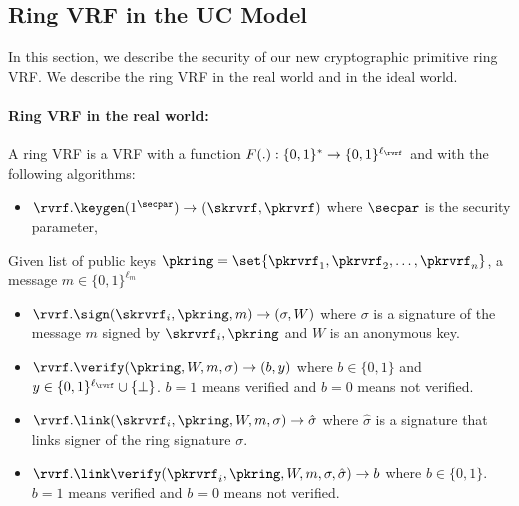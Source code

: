 \subsection{Ring VRF in the UC Model}


In this section, we describe the security of our new cryptographic primitive ring VRF. We describe the  ring VRF in the real world and in the ideal world. 

\paragraph{Ring VRF in the real world:}
\begin{definition}\label{def:ringvrf}
	A ring VRF is a VRF with a  function $ F(.):\{0,1\}^* \rightarrow \{0,1\}^{\ell_\rvrf} $ and with the following algorithms:
	
	\begin{itemize}
		\item $ \rvrf.\keygen(1^\secpar) \rightarrow (\skrvrf,\pkrvrf)$ where $ \secpar $ is the security parameter,
	\end{itemize}
	Given list of public keys $ \pkring = \set{\pkrvrf_1, \pkrvrf_2, \ldots, \pkrvrf_n}$, a message $ m \in \{0,1\}^{\ell_m} $
	\begin{itemize}
		\item $ \rvrf.\sign(\skrvrf_i, \pkring, m)\rightarrow (\sigma,W) $ where  $\sigma $ is a signature of the message $ m $ signed by $ \skrvrf_i, \pkring $ and $ W $ is an anonymous key.
		\item $ \rvrf.\verify(\pkring,W, m,\sigma) \rightarrow  (b, y)$ where $ b \in \{0,1\} $ and $ y \in \{0,1\}^{\ell_\rvrf}\cup \{\perp\} $. $ b =1 $ means verified and $ b = 0 $ means not verified.
		\item $ \rvrf.\link(\skrvrf_i, \pkring,W,m, \sigma) \rightarrow \hat\sigma $ where  $ \hat\sigma $ is a signature that links signer of the ring signature $ \sigma $. 
		\item $ \rvrf.\link\verify( \pkrvrf_i,\pkring,W, m, \sigma, \hat\sigma)\rightarrow b$ where $ b \in \{0,1\} $. $ b =1 $ means verified and $ b = 0 $ means not verified.
	\end{itemize}
\end{definition}

